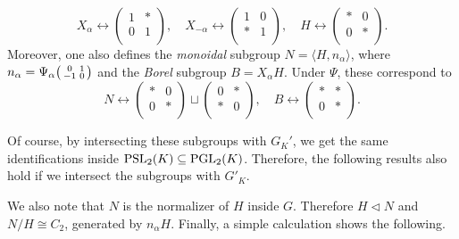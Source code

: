 $$X_\alpha \longleftrightarrow\begin{pmatrix}
    1 & *\\
    0 & 1\\
\end{pmatrix},\quad X_{-\alpha} \longleftrightarrow\begin{pmatrix}
    1 & 0\\
    * & 1\\
\end{pmatrix},\quad H\longleftrightarrow\begin{pmatrix}
    * & 0\\
    0 & *\\
\end{pmatrix}.$$
Moreover, one also defines the \textit{monoidal} subgroup $N=\langle H,n_\alpha\rangle$, where $n_\alpha=\Psi_\alpha\begin{psmallmatrix}
    0 & 1\\
    -1 & 0\\
\end{psmallmatrix}$ and the \textit{Borel} subgroup $B=X_\alpha H$. Under $\Psi$, these correspond to
$$N\longleftrightarrow\begin{pmatrix}
    * & 0\\
    0 & *\\
\end{pmatrix}\sqcup\begin{pmatrix}
    0 & *\\
    * & 0\\
\end{pmatrix},\quad B\longleftrightarrow\begin{pmatrix}
    * & *\\
    0 & *\\
\end{pmatrix}.$$

Of course, by intersecting these subgroups with $G_K'$, we get the same identifications inside $\mathrm{PSL}_2(K)\subseteq\mathrm{PGL}_2(K)$. Therefore, the following results also hold if we intersect the subgroups with $G'_K$.

We also note that $N$ is the normalizer of $H$ inside $G$. Therefore $H\triangleleft N$ and $N/H\cong C_2$, generated by $n_\alpha H$. Finally, a simple calculation shows the following.

